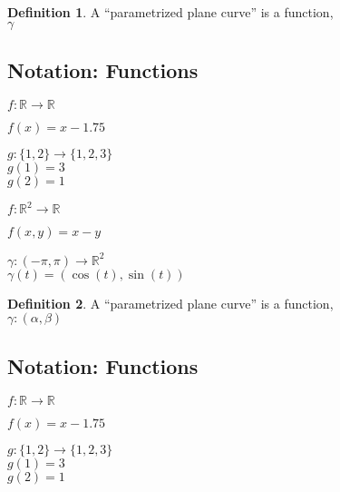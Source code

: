 \documentclass[twocolumn,20pt,fleqn]{extarticle}
\newcommand{\sep}{\vspace{0.5cm}}
\theoremstyle{plain}
\theoremstyle{definition}
\newtheorem*{definition}{Definition}
\theoremstyle{remark}
\begin{document}
\newpage



\begin{definition}
  A  ``parametrized plane curve''  is a  function,\\ $\gamma $\end{definition}


\clearpage




\subsection{Notation: Functions}

$ f: \mathbb{R}  \to \mathbb{R}$

$f(x) = x - 1.75$\\

\sep

  $g : \{1,2\} \to \{1,2,3\}$\\
    $g(1) = 3$\\
    $g(2) = 1$\\

\sep

$ f: \mathbb{R}^2  \to \mathbb{R}$

$f(  x,y  ) = x - y$


\sep

$\gamma :  (-\pi,\pi)  \to \mathbb{R}^2$\\
$\gamma(t) = (\cos(t), \sin(t))$



\newpage



\begin{definition}
  A  ``parametrized plane curve''  is a  function,\\ $\gamma  : (\alpha, \beta) $\end{definition}


\clearpage




\subsection{Notation: Functions}

$ f: \mathbb{R}  \to \mathbb{R}$

$f(x) = x - 1.75$\\

\sep

  $g : \{1,2\} \to \{1,2,3\}$\\
    $g(1) = 3$\\
    $g(2) = 1$\\
\end{document}
